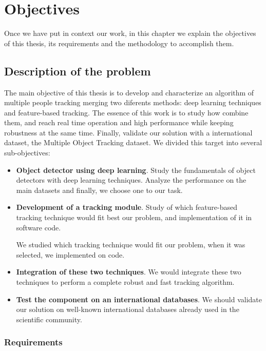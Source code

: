\chapter{Objectives}\label{cap.objetctives}

Once we have put in context our work, in this chapter we explain the objectives of this thesis, its requirements and the methodology to accomplish them.


\section{Description of the problem}

The main objective of this thesis is to develop and characterize an algorithm of multiple people tracking merging two diferents methods: deep learning techniques and feature-based tracking. The essence of this work is to study how combine them, and reach real time operation and high performance while keeping robustness at the same time. Finally, validate our solution with a international dataset, the Multiple Object Tracking dataset. We divided this target into several sub-objectives:

\begin{itemize}


\item \textbf{Object detector using deep learning}. Study the fundamentals of object detectors with deep learning techniques. Analyze the performance on the main datasets and finally, we choose one to our task. 

\item \textbf{Development of a tracking module}. Study of which feature-based tracking technique would fit best our problem, and implementation of it in software code.


We studied which tracking technique would fit our problem, when it was selected, we implemented on code.

\item \textbf{Integration of these two techniques}. We would integrate these two techniques to perform a complete robust and fast tracking algorithm.

\item \textbf{Test the component on an international databases}. We should validate our solution on well-known international databases already used in the scientific community. 


\end{itemize}

\subsection{Requirements}

